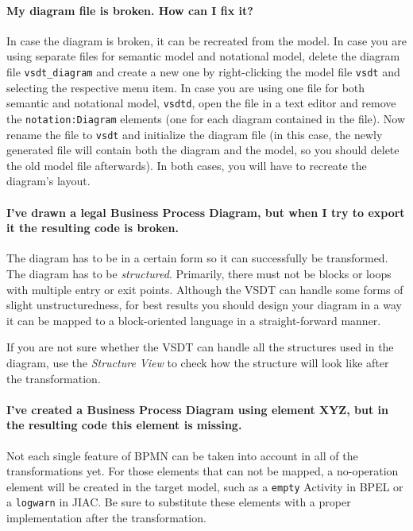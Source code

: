 \paragraph*{My diagram file is broken. How can I fix it?}
In case the diagram is broken, it can be recreated from the model.  In case you
are using separate files for semantic model and notational model, delete the
diagram file \texttt{vsdt\_diagram} and create a new one by right-clicking the
model file \texttt{vsdt} and selecting the respective menu item.  In case you are
using one file for both semantic and notational model, \texttt{vsdtd}, open the
file in a text editor and remove the \texttt{notation:Diagram} elements (one for
each diagram contained in the file).  Now rename the file to \texttt{vsdt} and
initialize the diagram file (in this case, the newly generated file will contain
both the diagram and the model, so you should delete the old model file afterwards).
In both cases, you will have to recreate the diagram's layout.


\paragraph*{I've drawn a legal Business Process Diagram, but when I try to export
it the resulting code is broken.}
The diagram has to be in a certain form so it can successfully be transformed.
The diagram has to be \emph{structured}.  Primarily, there must not be blocks or
loops with multiple entry or exit points.  Although the VSDT can handle some forms
of slight unstructuredness, for best results you should design your diagram in a
way it can be mapped to a block-oriented language in a straight-forward manner.

If you are not sure whether the VSDT can handle all the structures used in the
diagram, use the \emph{Structure View} to check how the structure will look like
after the transformation.


\paragraph*{I've created a Business Process Diagram using element XYZ, but in the
resulting code this element is missing.}
Not each single feature of BPMN can be taken into account in all of the
transformations yet.  For those elements that can not be mapped, a no-operation
element will be created in the target model, such as a \verb_empty_ Activity in
BPEL or a \verb_logwarn_ in JIAC.  Be sure to substitute these elements with a
proper implementation after the transformation.


